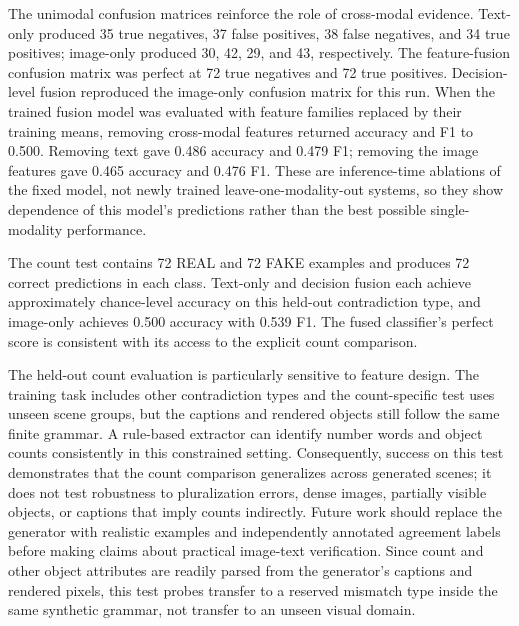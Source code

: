 \documentclass[conference]{IEEEtran}
\begin{document}
The unimodal confusion matrices reinforce the role of cross-modal evidence. Text-only produced 35 true negatives, 37 false positives, 38 false negatives, and 34 true positives; image-only produced 30, 42, 29, and 43, respectively. The feature-fusion confusion matrix was perfect at 72 true negatives and 72 true positives. Decision-level fusion reproduced the image-only confusion matrix for this run. When the trained fusion model was evaluated with feature families replaced by their training means, removing cross-modal features returned accuracy and F1 to 0.500. Removing text gave 0.486 accuracy and 0.479 F1; removing the image features gave 0.465 accuracy and 0.476 F1. These are inference-time ablations of the fixed model, not newly trained leave-one-modality-out systems, so they show dependence of this model's predictions rather than the best possible single-modality performance.

The count test contains 72 REAL and 72 FAKE examples and produces 72 correct predictions in each class. Text-only and decision fusion each achieve approximately chance-level accuracy on this held-out contradiction type, and image-only achieves 0.500 accuracy with 0.539 F1. The fused classifier's perfect score is consistent with its access to the explicit count comparison.

The held-out count evaluation is particularly sensitive to feature design. The training task includes other contradiction types and the count-specific test uses unseen scene groups, but the captions and rendered objects still follow the same finite grammar. A rule-based extractor can identify number words and object counts consistently in this constrained setting. Consequently, success on this test demonstrates that the count comparison generalizes across generated scenes; it does not test robustness to pluralization errors, dense images, partially visible objects, or captions that imply counts indirectly. Future work should replace the generator with realistic examples and independently annotated agreement labels before making claims about practical image-text verification. Since count and other object attributes are readily parsed from the generator's captions and rendered pixels, this test probes transfer to a reserved mismatch type inside the same synthetic grammar, not transfer to an unseen visual domain.
\end{document}
